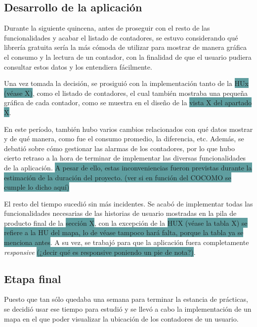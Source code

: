 \documentclass[pdftex,11pt,a4paper]{book}
\begin{document}
\subsection{Desarrollo de la aplicación}

Durante la siguiente quincena, antes de proseguir con el resto de las funcionalidades y acabar el listado de contadores, se estuvo considerando qué librería gratuita sería la más cómoda de utilizar para mostrar de manera gráfica el consumo y la lectura de un contador, con la finalidad de que el usuario pudiera consultar estos datos y los entendiera fácilmente. 

Una vez tomada la decisión, se prosiguió con la implementación tanto de la \colorbox{CadetBlue}{HUx (véase X)}, como el listado de contadores, el cual también mostraba una pequeña gráfica de cada contador, como se muestra en el diseño de la \colorbox{CadetBlue}{vista X del apartado X}.

En este período, también hubo varios cambios relacionados con qué datos mostrar y de qué manera, como fue el consumo promedio, la diferencia, etc. Además, se debatió sobre cómo gestionar las alarmas de los contadores, por lo que hubo cierto retraso a la hora de terminar de implementar las diversas funcionalidades de la aplicación. \colorbox{CadetBlue}{A pesar de ello, estas inconveniencias fueron previstas durante la estimación de la duración del proyecto. (ver si en función del COCOMO se cumple lo dicho aquí)}

El resto del tiempo sucedió sin más incidentes. Se acabó de implementar todas las funcionalidades necesarias de las historias de usuario mostradas en la pila de producto final de la \colorbox{CadetBlue}{sección X}, con la excepción de la \colorbox{CadetBlue}{HUX (véase la tabla X) se refiere a la HU del mapa, lo de véase tampoco hará falta, porque la tabla ya se menciona antes}. A su vez, se trabajó para que la aplicación fuera completamente \textit{responsive} \colorbox{CadetBlue}{ (¿decir qué es responsive poniendo un pie de nota?)}.

\subsection{Etapa final}

Puesto que tan sólo quedaba una semana para terminar la estancia de prácticas, se decidió usar ese tiempo para estudió y se llevó a cabo la implementación de un mapa en el que poder visualizar la ubicación de los contadores de un usuario.
\end{document}
